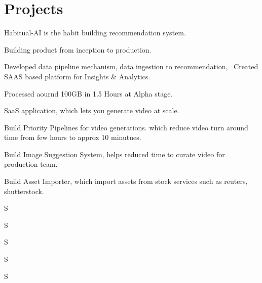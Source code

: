 \documentclass[]{deedy-resume-openfont}
\begin{document}
\begin{minipage}[t]{0.66\textwidth} 


\section{Projects}
\vspace{\topsep} %
\begin{tightemize}
\item Habitual-AI is the habit building recommendation system.
\item Building product from inception to production.
\item Developed data pipeline mechanism, data ingestion to recommendation, \
Created SAAS based platform for Insights \& Analytics.
\item Processed aournd 100GB in 1.5 Hours at Alpha stage.
\end{tightemize}
\sectionsep

\begin{tightemize}
\item SaaS application, which lets you generate video at scale.
\item Build Priority Pipelines for video generations. which reduce video turn around time from few hours to approx 10 minutues.
\item Build Image Suggestion System, helps reduced time to curate video for production team.
\item Build Asset Importer, which import assets from stock services such as reuters, shutterstock.
\end{tightemize}
\sectionsep

\begin{tightemize}
\item S
\end{tightemize}
\sectionsep

\begin{tightemize}
\item S
\end{tightemize}
\sectionsep

\begin{tightemize}
\item S
\end{tightemize}
\sectionsep

\begin{tightemize}
\item S
\end{tightemize}
\sectionsep

\begin{tightemize}
\item S
\end{tightemize}
\sectionsep

\end{minipage} 
\end{document}
